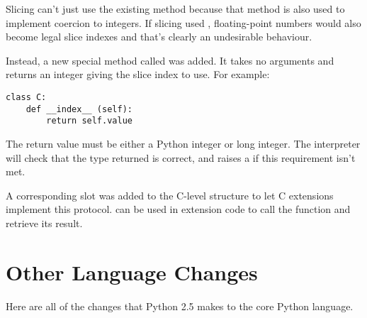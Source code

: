 \documentclass{howto}
\begin{document}
Slicing can't just use the existing  method because
that method is also used to implement coercion to integers.  If
slicing used , floating-point numbers would also
become legal slice indexes and that's clearly an undesirable
behaviour.

Instead, a new special method called  was added.  It
takes no arguments and returns an integer giving the slice index to
use.  For example:

\begin{verbatim}
class C:
    def __index__ (self):
        return self.value  
\end{verbatim}

The return value must be either a Python integer or long integer.
The interpreter will check that the type returned is correct, and
raises a  if this requirement isn't met.

A corresponding  slot was added to the C-level
 structure to let C extensions implement this
protocol.   can be used in
extension code to call the  function and retrieve
its result.

\begin{seealso}


\end{seealso}


\section{Other Language Changes\label{other-lang}}

Here are all of the changes that Python 2.5 makes to the core Python
language.
\end{document}

